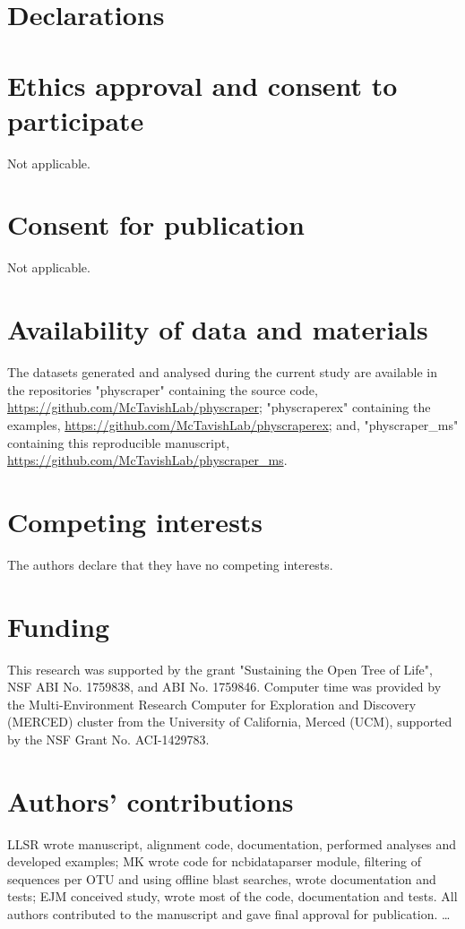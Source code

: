 \documentclass{bmcart}
\begin{document}
\section*{Declarations}

\begin{backmatter}

\section*{Ethics approval and consent to participate}
Not applicable.

\section*{Consent for publication}
Not applicable.

\section*{Availability of data and materials}

The datasets generated and analysed during the current study are available in
the repositories "physcraper" containing the source code,
\href{https://github.com/McTavishLab/physcraper}{https://github.com/McTavishLab/physcraper};
"physcraperex" containing the examples,
\href{https://github.com/McTavishLab/physcraperex}{https://github.com/McTavishLab/physcraperex};
and, "physcraper\_ms" containing this reproducible manuscript,
\href{https://github.com/McTavishLab/physcraper\_ms}{https://github.com/McTavishLab/physcraper\_ms}.

\section*{Competing interests}
The authors declare that they have no competing interests.

\section*{Funding}
This research was supported by the grant "Sustaining the Open Tree of Life", NSF ABI
No. 1759838, and ABI No. 1759846.
Computer time was provided by the Multi-Environment Research Computer for
Exploration and Discovery (MERCED) cluster from the University of California,
Merced (UCM), supported by the NSF Grant No. ACI-1429783.

\section*{Authors' contributions}
LLSR wrote manuscript, alignment code, documentation, performed analyses and developed examples; MK wrote code for ncbidataparser module, filtering of sequences per OTU and using offline blast searches, wrote documentation and tests; EJM conceived study, wrote most of the code, documentation and tests.
All authors contributed to the manuscript and gave final approval for publication.
\ldots


\end{backmatter}
\end{document}
